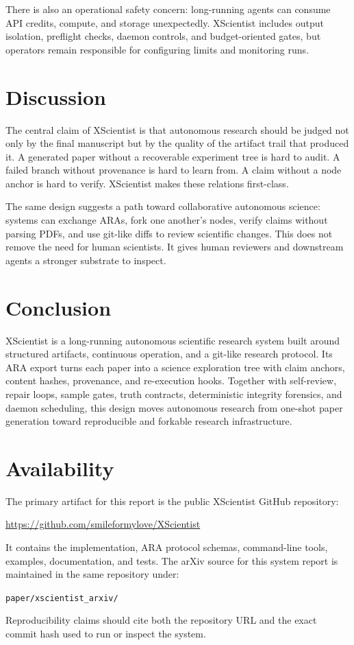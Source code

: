 \documentclass[11pt]{article}
\begin{document}
There is also an operational safety concern: long-running agents can consume
API credits, compute, and storage unexpectedly. XScientist includes output
isolation, preflight checks, daemon controls, and budget-oriented gates, but
operators remain responsible for configuring limits and monitoring runs.

\section{Discussion}

The central claim of XScientist is that autonomous research should be judged
not only by the final manuscript but by the quality of the artifact trail that
produced it. A generated paper without a recoverable experiment tree is hard
to audit. A failed branch without provenance is hard to learn from. A claim
without a node anchor is hard to verify. XScientist makes these relations
first-class.

The same design suggests a path toward collaborative autonomous science:
systems can exchange ARAs, fork one another's nodes, verify claims without
parsing PDFs, and use git-like diffs to review scientific changes. This does
not remove the need for human scientists. It gives human reviewers and
downstream agents a stronger substrate to inspect.

\section{Conclusion}

XScientist is a long-running autonomous scientific research system built
around structured artifacts, continuous operation, and a git-like research
protocol. Its ARA export turns each paper into a science exploration tree with
claim anchors, content hashes, provenance, and re-execution hooks. Together
with self-review, repair loops, sample gates, truth contracts, deterministic
integrity forensics, and daemon scheduling, this design moves autonomous
research from one-shot paper generation toward reproducible and forkable
research infrastructure.

\section*{Availability}

The primary artifact for this report is the public XScientist GitHub
repository:
\begin{center}
\url{https://github.com/smileformylove/XScientist}
\end{center}
It contains the implementation, ARA protocol schemas, command-line tools,
examples, documentation, and tests. The arXiv source for this system report is
maintained in the same repository under:
\begin{center}
\texttt{paper/xscientist\_arxiv/}
\end{center}
Reproducibility claims should cite both the repository URL and the exact commit
hash used to run or inspect the system.
\end{document}
